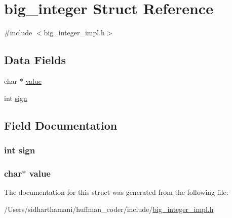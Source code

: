 \hypertarget{structbig__integer}{\section{big\-\_\-integer Struct Reference}
\label{structbig__integer}
}


{\ttfamily \#include $<$big\-\_\-integer\-\_\-impl.\-h$>$}

\subsection*{Data Fields}
\begin{DoxyCompactItemize}
\item 
char $\ast$ \hyperlink{structbig__integer_a4e9aec275e566b978a3ccb4e043d8c61}{value}
\item 
int \hyperlink{structbig__integer_abbeb8ae63622a7fef0b5a56bb91a1682}{sign}
\end{DoxyCompactItemize}


\subsection{Field Documentation}
\hypertarget{structbig__integer_abbeb8ae63622a7fef0b5a56bb91a1682}{
\subsubsection[{sign}]{\setlength{\rightskip}{0pt plus 5cm}int sign}}\label{structbig__integer_abbeb8ae63622a7fef0b5a56bb91a1682}
\hypertarget{structbig__integer_a4e9aec275e566b978a3ccb4e043d8c61}{
\subsubsection[{value}]{\setlength{\rightskip}{0pt plus 5cm}char$\ast$ value}}\label{structbig__integer_a4e9aec275e566b978a3ccb4e043d8c61}


The documentation for this struct was generated from the following file\-:\begin{DoxyCompactItemize}
\item 
/\-Users/sidharthamani/huffman\-\_\-coder/include/\hyperlink{big__integer__impl_8h}{big\-\_\-integer\-\_\-impl.\-h}\end{DoxyCompactItemize}
